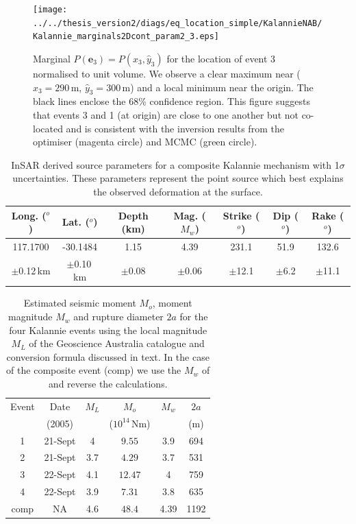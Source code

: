 \documentclass[grl]{agutex}
\begin{document}
\begin{figure}
\noindent\texttt{[image: ../../thesis\_version2/diags/eq\_location\_simple/KalannieNAB/Kalannie\_marginals2Dcont\_param2\_3.eps]} \\
\caption{Marginal $P(\mathbf{e}_3) = P(\hat{x}_3,\hat{y}_3)$  for the location of event 3 normalised to unit volume.
We observe a clear maximum
near ($\hat{x}_3=290$\,m, $\hat{y}_3=300$\,m) and a local minimum near the origin. The black lines
enclose the 68\% confidence region. This figure suggests that events 3 and 1 (at origin) are close to one another but
not co-located and is consistent with the inversion results from the optimiser (magenta circle) and
MCMC (green circle).}
\label{fig:Kalannie-2Dmarginals_param23}
\end{figure}

\clearpage


\begin{table}
\caption[InSAR source parameters for composite Kalannie mechanism]
{\cite{dr_Dawson08a} InSAR derived source parameters for a composite Kalannie mechanism with 1$\sigma$ uncertainties.
These parameters represent the point source which best explains the observed deformation at the surface. }
\label{tab-Dawson-Kalannie-results}
\begin{tabular}{ccccccc}
\hline
Long. ($^o$) & Lat. ($^o$) & Depth (km) & Mag. ($M_w$) & Strike ($^o$) & Dip ($^o$) & Rake ($^o$) \\
\hline
117.1700 & -30.1484 & 1.15 & 4.39 & 231.1 & 51.9 & 132.6 \\
$\pm$0.12\,km &  $\pm$0.10\,km & $\pm$0.08 & $\pm$0.06 & $\pm$12.1 & $\pm$6.2 & $\pm$11.1 \\
\hline
\end{tabular}
\end{table}




\begin{table}
\caption[Kalannie earthquake magnitudes, seismic moments and dimensions]
{Estimated seismic moment $M_o$, moment magnitude $M_w$ and rupture diameter $2a$ for the
four Kalannie events using the local magnitude $M_L$ of the Geoscience Australia catalogue and conversion
formula discussed in text. In the case of the composite event (comp) we use the $M_w$ of \citet{dr_Dawson08a} and reverse
the calculations.}
\label{tab:Kalannie-eventsizes}
\begin{tabular}{c|ccccc}
\hline
Event & Date     & $M_L$ & $M_o$           & $M_w$   &  $2a$\\
      & (2005)   &       & ($10^{14}$\,Nm) &         &  (m)\\
\hline
1     &  21-Sept & 4     & $9.55$          & 3.9     & 694\\
2     &  21-Sept & 3.7   & $4.29$          & 3.7     & 531\\
3     &  22-Sept  & 4.1  & $12.47$         & 4       & 759\\
4     &  22-Sept  & 3.9  & $7.31$          & 3.8     & 635\\
comp  &  NA       & 4.6  & $48.4$          & 4.39    & 1192\\
\hline
\end{tabular}
\end{table}
\end{document}
